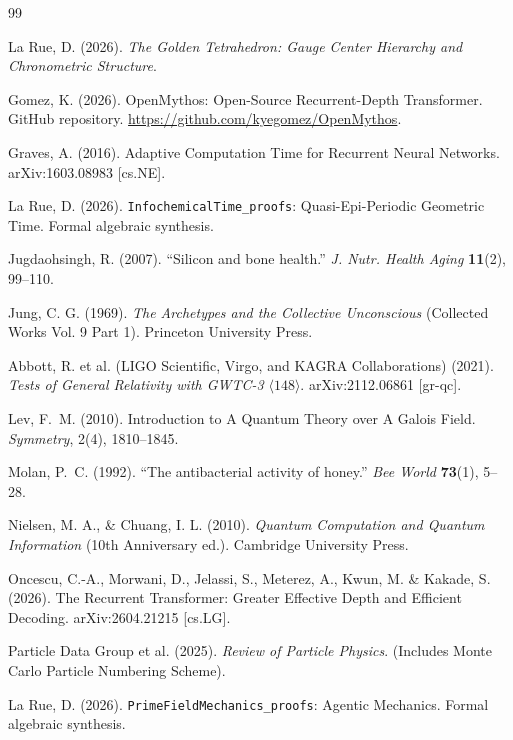\documentclass[12pt,oneside]{book}
\begin{document}
\begin{thebibliography}{99}

La Rue, D. (2026).
\textit{The Golden Tetrahedron: Gauge Center Hierarchy and Chronometric Structure}.

Gomez, K. (2026).
OpenMythos: Open-Source Recurrent-Depth Transformer.
GitHub repository. \url{https://github.com/kyegomez/OpenMythos}.

Graves, A. (2016).
Adaptive Computation Time for Recurrent Neural Networks.
arXiv:1603.08983 [cs.NE].

La Rue, D. (2026).
\texttt{InfochemicalTime\_proofs}: Quasi-Epi-Periodic Geometric Time.
Formal algebraic synthesis.

Jugdaohsingh, R. (2007).
``Silicon and bone health.''
\textit{J. Nutr. Health Aging} \textbf{11}(2), 99--110.

Jung, C. G. (1969).
\textit{The Archetypes and the Collective Unconscious} (Collected Works Vol. 9 Part 1).
Princeton University Press.

Abbott, R. et al. (LIGO Scientific, Virgo, and KAGRA Collaborations) (2021).
\textit{Tests of General Relativity with GWTC-3} $\langle 148 \rangle$.
arXiv:2112.06861 [gr-qc].

Lev, F.~M. (2010).
Introduction to A Quantum Theory over A Galois Field.
\textit{Symmetry}, 2(4), 1810--1845.

Molan, P.~C. (1992).
``The antibacterial activity of honey.''
\textit{Bee World} \textbf{73}(1), 5--28.

Nielsen, M. A., \& Chuang, I. L. (2010).
\textit{Quantum Computation and Quantum Information} (10th Anniversary ed.). Cambridge University Press.

Oncescu, C.-A., Morwani, D., Jelassi, S., Meterez, A., Kwun, M. \& Kakade, S. (2026).
The Recurrent Transformer: Greater Effective Depth and Efficient Decoding.
arXiv:2604.21215 [cs.LG].

Particle Data Group et al. (2025).
\textit{Review of Particle Physics}. 
(Includes Monte Carlo Particle Numbering Scheme).

La Rue, D. (2026).
\texttt{PrimeFieldMechanics\_proofs}: Agentic Mechanics.
Formal algebraic synthesis.


\end{thebibliography}
\end{document}
